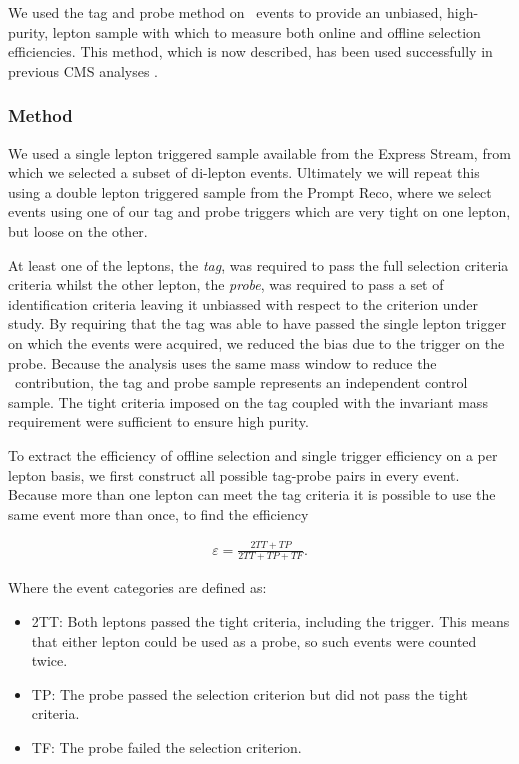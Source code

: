  
We used the tag and probe method on \dyll~events to provide an unbiased, high-purity, 
lepton sample with which to measure both online and offline selection efficiencies.
This method, which is now described, 
has been used successfully in previous CMS analyses \cite{ref:tagprobe_mit_w}\cite{ref:tagprobe_snt_top}.

\subsubsection{Method}
We used a single lepton triggered sample available from the Express Stream, 
from which we selected a subset of di-lepton events.
Ultimately we will repeat this using a double lepton triggered sample from the Prompt Reco,
where we select events using one of our tag and probe triggers which are very tight on one lepton,
but loose on the other.

At least one of the leptons, the {\it tag}, was required to pass the full selection criteria criteria 
whilst the other lepton, the {\it probe}, was required to pass a set of identification criteria leaving 
it unbiassed with respect to the criterion under study. 
By requiring that the tag was able to have passed the single lepton trigger on which the events were acquired, 
we reduced the bias due to the trigger on the probe.
Because the analysis uses the same mass window to reduce the \dyll~contribution, 
the tag and probe sample represents an independent control sample.
The tight criteria imposed on the tag coupled with the invariant mass requirement were sufficient to ensure high purity.

To extract the efficiency of offline selection and single trigger efficiency on a per lepton basis, 
we first construct all possible tag-probe pairs in every event.
Because more than one lepton can meet the tag criteria it is possible to use the same event more than once, to find the efficiency

\begin{eqnarray}
\label{eqn:tagAndProbeEfficiencyEqn}
\varepsilon = \frac{2TT + TP}{2TT + TP + TF}.
\end{eqnarray}

Where the event categories are defined as:

\begin{itemize}
	\item 2TT: Both leptons passed the tight criteria, including the trigger. This means that either lepton could be used as a probe, 
	so such events were counted twice.
	\item TP: The probe passed the selection criterion but did not pass the tight criteria.
	\item TF: The probe failed the selection criterion.
\end{itemize}

